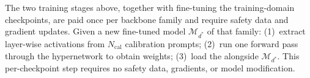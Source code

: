  The two training stages above, together with fine-tuning the training-domain checkpoints, are paid once per backbone family and require safety data and gradient updates. Given a new fine-tuned model $\mathcal{M}_{d^*}$ of that family: (1)~extract layer-wise activations from $N_\text{cal}$ calibration prompts; (2)~run one forward pass through the hypernetwork to obtain \ssn{} weights; (3)~load the \ssn{} alongside $\mathcal{M}_{d^*}$. This per-checkpoint step requires no safety data, gradients, or model modification.